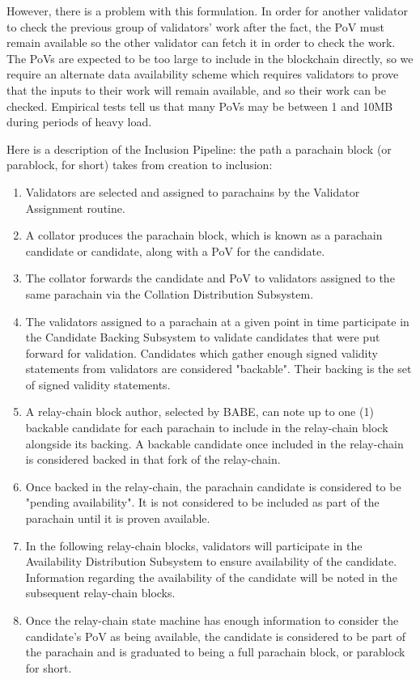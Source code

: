 However, there is a problem with this formulation. In order for another
validator to check the previous group of validators' work after the fact, the
PoV must remain available so the other validator can fetch it in order to check
the work. The PoVs are expected to be too large to include in the blockchain
directly, so we require an alternate data availability scheme which requires
validators to prove that the inputs to their work will remain available, and so
their work can be checked. Empirical tests tell us that many PoVs may be between
1 and 10MB during periods of heavy load.
\newline

Here is a description of the Inclusion Pipeline: the path a parachain block (or
parablock, for short) takes from creation to inclusion:
\newline

\begin{enumerate}
    \item Validators are selected and assigned to parachains by the Validator
    Assignment routine.
    \item A collator produces the parachain block, which is known as a parachain
    candidate or candidate, along with a PoV for the candidate.
    \item The collator forwards the candidate and PoV to validators assigned to
    the same parachain via the Collation Distribution Subsystem.
    \item The validators assigned to a parachain at a given point in time
    participate in the Candidate Backing Subsystem to validate candidates that
    were put forward for validation. Candidates which gather enough signed
    validity statements from validators are considered "backable". Their backing
    is the set of signed validity statements.
    \item A relay-chain block author, selected by BABE, can note up to one (1)
    backable candidate for each parachain to include in the relay-chain block
    alongside its backing. A backable candidate once included in the relay-chain
    is considered backed in that fork of the relay-chain.
    \item Once backed in the relay-chain, the parachain candidate is considered
    to be "pending availability". It is not considered to be included as part of
    the parachain until it is proven available.
    \item In the following relay-chain blocks, validators will participate in
    the Availability Distribution Subsystem to ensure availability of the
    candidate. Information regarding the availability of the candidate will be
    noted in the subsequent relay-chain blocks.
    \item Once the relay-chain state machine has enough information to consider
    the candidate's PoV as being available, the candidate is considered to be
    part of the parachain and is graduated to being a full parachain block, or
    parablock for short.
\end{enumerate}

